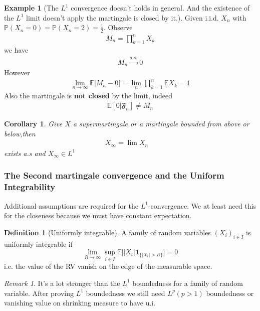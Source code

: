 \documentclass[a4paper,11pt]{book}
\newtheorem{corollary}{Corollary}[theorem]
\theoremstyle{definition}
\newtheorem{definition}{Definition}[section]
\newtheorem*{example}{Example}
\theoremstyle{remark}
\newtheorem*{remark}{Remark}
\begin{document}
\begin{example}[The $L^1$ convergence doesn't holds in general. And the existence of the $L^1$ limit doesn't apply the martingale is closed by it.]
Given i.i.d. $X_n$ with $\mathbb{P}(X_n = 0) = \mathbb{P}(X_n = 2) = \frac{1}{2}$. Observe
\begin{align*}
	M_n = \prod_{k = 1}^n X_k
\end{align*}
we have
\begin{align*}
	M_n \overset{a.s.}{\rightarrow} 0
\end{align*}
However
\begin{align*}
	\lim_{n \rightarrow\infty}\mathbb{E}|M_n - 0|=\lim_n \prod_{k = 1}^n\mathbb{E}X_k = 1
\end{align*}
Also the martingale is \textbf{not closed} by the limit, indeed
\begin{align*}
	\mathbb{E}[0 | \mathfrak{F}_n] \neq M_n
\end{align*}
\end{example}

\begin{corollary}
	Give $X$ a supermartingale or a martingale bounded from above or below,then 
	\begin{align*}
		X_\infty = \lim X_n \quad
	\end{align*}
	exists a.s and $X_\infty \in L^1$
\end{corollary}



\subsubsection*{The Second martingale convergence and the Uniform Integrability}
Additional assumptions are required for the $L^1$-convergence. We at least need this for the closeness because we must have constant expectation. 
 \begin{definition}[Uniformly integrable]
 	A family of random variables $(X_i)_{i \in I}$ is uniformly integrable if
 	\begin{equation*}
 		\lim_{R \rightarrow \infty} \sup_{i \in I} \mathbb{E}\bigg[ |X_i| \textbf{1}_{\{|X_i| > R\}}\bigg] = 0
 	\end{equation*}
 	i.e. the value of the RV vanish on the edge of the measurable space.
 \end{definition}
\begin{remark}
	It's a lot stronger than the $L^1$ boundedness for a family of random variable. After proving $L^1$ boundedness we still need $L^p(p>1)$ boundedness or vanishing value on shrinking measure to have u.i.
\end{remark}
\end{document}
